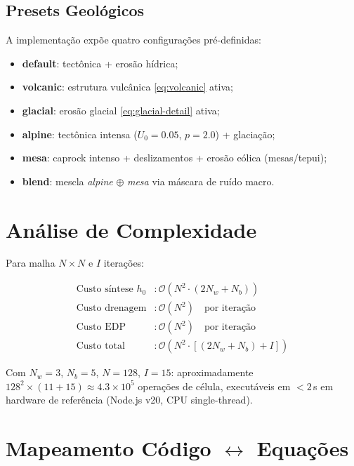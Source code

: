 \documentclass[11pt,a4paper]{article}
\begin{document}
\subsection{Presets Geológicos}

A implementação expõe quatro configurações pré-definidas:

\begin{itemize}
  \item \textbf{default}: tectônica + erosão hídrica;
  \item \textbf{volcanic}: estrutura vulcânica \eqref{eq:volcanic} ativa;
  \item \textbf{glacial}: erosão glacial \eqref{eq:glacial-detail} ativa;
  \item \textbf{alpine}: tectônica intensa ($U_0 = 0.05$, $p = 2.0$) + glaciação;
  \item \textbf{mesa}: caprock intenso + deslizamentos + erosão eólica (mesas/tepui);
  \item \textbf{blend}: mescla \emph{alpine} $\oplus$ \emph{mesa} via máscara de ruído macro.
\end{itemize}

\section{Análise de Complexidade}

Para malha $N \times N$ e $I$ iterações:

\begin{align}
  \text{Custo síntese } h_0 &: \mathcal{O}(N^2 \cdot (2N_w + N_b)) \\
  \text{Custo drenagem}     &: \mathcal{O}(N^2) \quad \text{por iteração} \\
  \text{Custo EDP}            &: \mathcal{O}(N^2) \quad \text{por iteração} \\
  \text{Custo total}          &: \mathcal{O}\!\left(N^2 \cdot \left[(2N_w + N_b) + I\right]\right)
\end{align}

Com $N_w = 3$, $N_b = 5$, $N = 128$, $I = 15$: aproximadamente
$128^2 \times (11 + 15) \approx 4.3 \times 10^5$ operações de célula,
executáveis em $< 2$\,s em hardware de referência (Node.js v20, CPU single-thread).

\section{Mapeamento Código $\leftrightarrow$ Equações}
\end{document}
